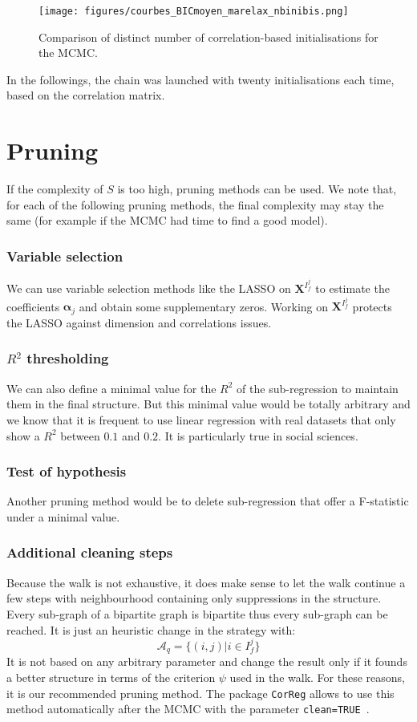 \documentclass[12pt,a4paper]{report}
\begin{document}
	\begin{center}
	\begin{figure}[h!]
	\centering
		\texttt{[image: figures/courbes\_BICmoyen\_marelax\_nbinibis.png]} 
		\caption{Comparison of distinct number of correlation-based initialisations for the MCMC.}\label{nbini}
	\end{figure}
	\end{center}
		In the followings, the chain was launched with twenty initialisations each time, based on the correlation matrix.

	\section{Pruning}
		If the complexity of $S$ is too high, pruning methods can be used. We note that, for each of the following pruning methods, the final complexity may stay the same (for example if the MCMC had time to find a good model).
		\subsubsection{Variable selection}
			We can use variable selection methods like the LASSO on $\boldsymbol{X}^{I_f^j}$ to estimate the coefficients $\boldsymbol{\alpha}_j$ and obtain some supplementary zeros. Working on $\boldsymbol{X}^{I_f^j}$ protects the LASSO against dimension and correlations issues.
		\subsubsection{$R^2$ thresholding }
			We can also define a minimal value for the $R^2$ of the sub-regression to maintain them in the final structure. But this minimal value would be totally arbitrary and we know that it is frequent to use linear regression with real datasets that only show a $R^2$ between $0.1$ and $0.2$. It is particularly true in social sciences.
		\subsubsection{Test of hypothesis}
			Another pruning method would be to delete sub-regression that offer a F-statistic under a minimal value.
		\subsubsection{Additional cleaning steps}
			Because the walk is not exhaustive, it does make sense to let the walk continue a few steps with neighbourhood containing only suppressions in the structure. Every sub-graph of a bipartite graph is bipartite thus every sub-graph can be reached. It is just an heuristic change in the strategy with:
			\begin{equation}
				\mathcal{A}_q=\{(i,j)| i \in I_f^j \}
			\end{equation}
			It is not based on any arbitrary parameter and change the result only if it founds a better structure in terms of the criterion $\psi$ used in the walk.
			For these reasons, it is our recommended pruning method. The package {\tt CorReg} allows to use this method automatically after the MCMC with the parameter {\tt clean=TRUE }.
\end{document}
